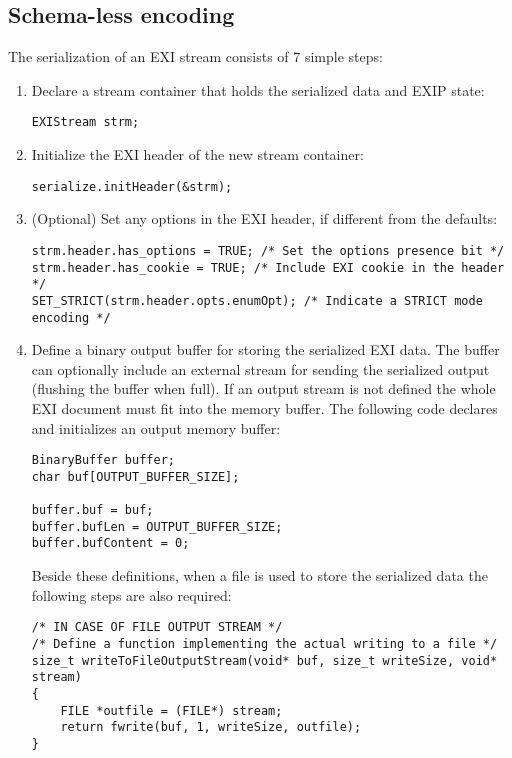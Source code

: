\subsection{Schema-less encoding}
The serialization of an EXI stream consists of 7 simple steps:
\begin{enumerate}
 \item Declare a stream container that holds the serialized data and EXIP state:
\begin{lstlisting}
EXIStream strm;
\end{lstlisting}

 \item Initialize the EXI header of the new stream container:
\begin{lstlisting}
serialize.initHeader(&strm);                                                            
\end{lstlisting}

 \item \label{item:step-options} (Optional) Set any options in the EXI header, if different from the defaults:
\begin{lstlisting}
strm.header.has_options = TRUE; /* Set the options presence bit */ 
strm.header.has_cookie = TRUE; /* Include EXI cookie in the header */
SET_STRICT(strm.header.opts.enumOpt); /* Indicate a STRICT mode encoding */
\end{lstlisting}

 \item Define a binary output buffer for storing the serialized EXI data.
The buffer can optionally include an external stream for sending the
serialized output (flushing the buffer when full). If an output stream
is not defined the whole EXI document must fit into the memory buffer.
The following code declares and initializes an output memory buffer:
\begin{lstlisting}
BinaryBuffer buffer;
char buf[OUTPUT_BUFFER_SIZE];

buffer.buf = buf;
buffer.bufLen = OUTPUT_BUFFER_SIZE;
buffer.bufContent = 0;
\end{lstlisting}
Beside these definitions, when a file is used to store the
serialized data the following steps are also required: 
\begin{lstlisting}
/* IN CASE OF FILE OUTPUT STREAM */
/* Define a function implementing the actual writing to a file */
size_t writeToFileOutputStream(void* buf, size_t writeSize, void* stream)
{
	FILE *outfile = (FILE*) stream;
	return fwrite(buf, 1, writeSize, outfile);
}


\end{lstlisting}
\end{enumerate}
